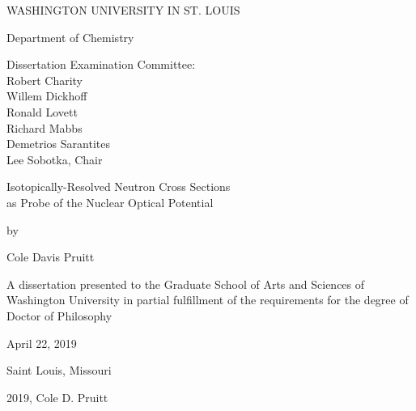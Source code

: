 \begin{titlepage}
    \begin{singlespace}
        \begin{center}
            \vspace*{1cm}

            WASHINGTON UNIVERSITY IN ST. LOUIS

            \vspace{0.5cm}
            Department of Chemistry

            \vspace{1.5cm}

            Dissertation Examination Committee:\\
            Robert Charity\\
            Willem Dickhoff\\ 
            Ronald Lovett\\
            Richard Mabbs\\
            Demetrios Sarantites\\
            Lee Sobotka, Chair\\

            \vspace{1.5 cm}

            Isotopically-Resolved Neutron Cross Sections\\
            as Probe of the Nuclear Optical Potential

            \vspace{0.5 cm}

            by

            \vspace{0.5 cm}

            Cole Davis Pruitt

            \vfill

            A dissertation presented to the Graduate School of Arts and Sciences of Washington University in partial fulfillment of the requirements for the degree of Doctor of Philosophy

            \vspace{0.8cm}

            April 22, 2019

            \vspace{0.5 cm}
            Saint Louis, Missouri

        \end{center}
    \end{singlespace}
\end{titlepage}

\clearpage

\vspace*{\fill}
\begin{center}    
    \textcopyright \hspace{2pt} 2019, Cole D. Pruitt
\end{center}
\vspace*{\fill}

\thispagestyle{empty} %
\addtocounter{page}{-1}%
\clearpage
